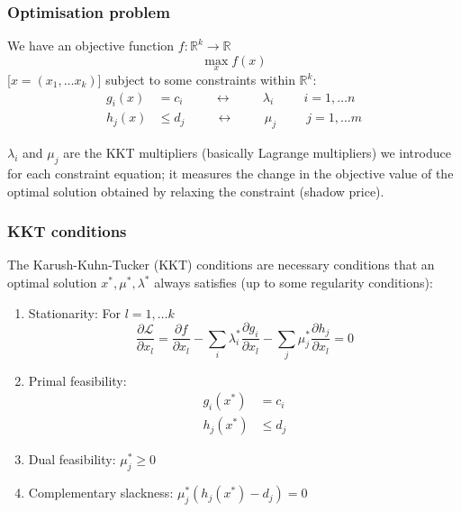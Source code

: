 \documentclass[10pt,aspectratio=169,dvipsnames]{beamer}
\newcommand{\R}{\mathbb{R}}
\def\l{\lambda}
\def\m{\mu}
\def\d{\partial}
\def\cL{\mathcal{L}}
\let\olditem\item
\renewcommand{\item}{%
\olditem\vspace{5pt}}
\begin{document}
\begin{frame}
  \frametitle{Optimisation problem}


We have an \alert{objective function} $f: \R^k \to \R$
\begin{equation*}
  \max_{x} f(x)
\end{equation*}
[$x = (x_1, \dots x_k)$] subject to some \alert{constraints} within $\R^k$:
\begin{align*}
  g_i(x) & = c_i \hspace{1cm}\leftrightarrow\hspace{1cm} \l_i \hspace{1cm} i = 1,\dots n \\
  h_j(x) & \leq d_j \hspace{1cm}\leftrightarrow\hspace{1cm} \m_j \hspace{1cm} j = 1,\dots m
\end{align*}

$\l_i$ and $\m_j$ are the \alert{KKT multipliers} (basically Lagrange multipliers) we introduce for
each constraint equation; it measures the change in the objective value of the optimal solution obtained by relaxing the constraint (shadow price).

\end{frame}



\begin{frame}
  \frametitle{KKT conditions}

The \alert{Karush-Kuhn-Tucker (KKT) conditions} are necessary conditions that an optimal solution $x^*,\m^*,\l^*$ always satisfies (up to some regularity conditions):
\begin{enumerate}
\item \alert{Stationarity}: For $l = 1,\dots k$
  \begin{equation*}
  \frac{\d \cL}{\d x_l} =   \frac{\d f}{\d x_l} - \sum_i \l_i^* \frac{\d g_i}{\d x_l}  - \sum_j \m_j^* \frac{\d h_j}{\d x_l} = 0
  \end{equation*}
    \item \alert{Primal feasibility}:
      \begin{align*}
        g_i(x^*) & = c_i \\
        h_j(x^*) &\leq d_j
      \end{align*}
    \item \alert{Dual feasibility}: $\m_j^* \geq 0$
    \item \alert{Complementary slackness}: $\m_j^* (h_j(x^*) - d_j) = 0$
\end{enumerate}

\end{frame}
\end{document}
